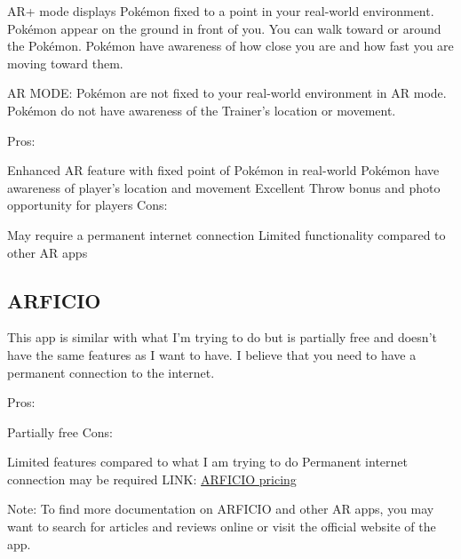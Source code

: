 AR+ mode displays Pokémon fixed to a point in your real-world environment. Pokémon appear on the ground in front of you. You can walk toward or around the Pokémon. Pokémon have awareness of how close you are and how fast you are moving toward them.

AR MODE:
Pokémon are not fixed to your real-world environment in AR mode. Pokémon do not have awareness of the Trainer’s location or movement.

Pros:

Enhanced AR feature with fixed point of Pokémon in real-world
Pokémon have awareness of player's location and movement
Excellent Throw bonus and photo opportunity for players
Cons:

May require a permanent internet connection
Limited functionality compared to other AR apps
\subsection{ARFICIO}
This app is similar with what I'm trying to do but is partially free and doesn't have the same features as I want to have. I believe that you need to have a permanent connection to the internet.

Pros:

Partially free
Cons:

Limited features compared to what I am trying to do
Permanent internet connection may be required
LINK: \href{https://arficio.com/pricing/}{ARFICIO pricing}

Note: To find more documentation on ARFICIO and other AR apps, you may want to search for articles and reviews online or visit the official website of the app.